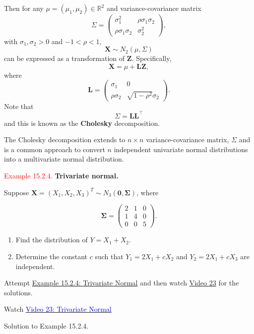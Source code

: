 \documentclass[
]{book}
\begin{document}
Then for any \(\mu =(\mu_1,\mu_2) \in \mathbb{R}^2\) and variance-covariance matrix
\[ \Sigma = \begin{pmatrix} \sigma_1^2 & \rho \sigma_1 \sigma_2 \\
\rho \sigma_1 \sigma_2 & \sigma_2^2\end{pmatrix}, \] with \(\sigma_1, \sigma_2 >0\) and \(-1 < \rho <1\), \[\mathbf{X} \sim N_2 ( \mu, \Sigma)\] can be expressed as a transformation of \(\mathbf{Z}\). Specifically,
\[ \mathbf{X} = \mu + \mathbf{L} \mathbf{Z}, \]
where \[ \mathbf{L} =  \begin{pmatrix} \sigma_1 & 0 \\
\rho \sigma_2 & \sqrt{1-\rho^2} \sigma_2\end{pmatrix}. \]
Note that
\[ \Sigma = \mathbf{L} \mathbf{L}^\top \]
and this is known as the \textbf{Cholesky} decomposition.

The Cholesky decomposition extends to \(n \times n\) variance-covariance matrix, \(\Sigma\) and is a common approach to convert \(n\) independent univariate normal distributions into a multivariate normal distribution.

\leavevmode{}%
\textcolor{red}{Example 15.2.4.}
{\textbf{Trivariate normal.}}

Suppose \(\mathbf{X}=(X_1,X_2,X_3)^T \sim N_3(\mathbf{0},\mathbf{\Sigma})\), where

\[\mathbf{\Sigma} = \begin{pmatrix} 2 & 1 & 0 \\ 1 & 4 & 0 \\ 0 & 0 & 5 \end{pmatrix}.\]

\begin{enumerate}
\def\labelenumi{(\alph{enumi})}
\item
  Find the distribution of \(Y=X_1+X_2\).
\item
  Determine the constant \(c\) such that \(Y_1 = 2X_1 + cX_2\) and \(Y_2 = 2X_1 + cX_3\) are independent.
\end{enumerate}

Attempt \protect\hyperlink{MV_Normal:exer:tri}{Example 15.2.4: Trivariate Normal} and then watch \protect\hyperlink{video23}{Video 23} for the solutions.

Watch \href{https://mediaspace.nottingham.ac.uk/media/Multivariate+Normal+FINAL+VERSION/1_092gq067}{\textcolor{blue}{Video 23: Trivariate Normal}}

Solution to Example 15.2.4.
\end{document}

